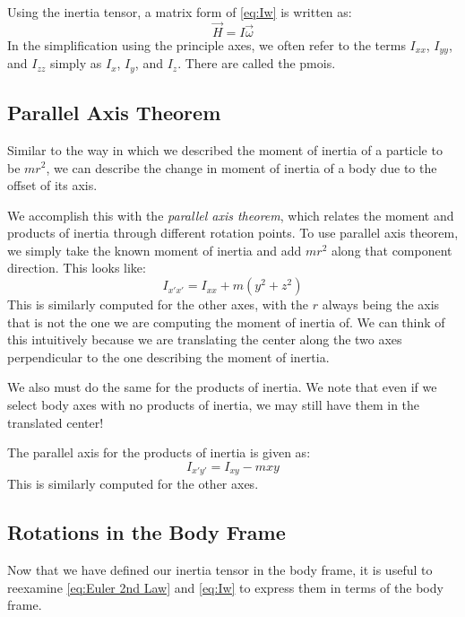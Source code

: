 \documentclass[12pt]{report}
\begin{document}
Using the inertia tensor, a matrix form of \eqref{eq:Iw}  is written as:
\begin{equation}\label{eq:IwVec}
    \vec{H}=I\vec{\omega}
\end{equation}
In the simplification using the principle axes, we often refer to the terms $I_{xx}$, $I_{yy}$, and $I_{zz}$ simply as $I_x$, $I_y$, and $I_z$. There are called the \glspl{pmoi}.

\subsection{Parallel Axis Theorem}
Similar to the way in which we described the moment of inertia of a particle to be $mr^2$, we can describe the change in moment of inertia of a body due to the offset of its axis.

We accomplish this with the \textit{parallel axis theorem}, which relates the moment and products of inertia through different rotation points. To use parallel axis theorem, we simply take the known moment of inertia and add $mr^2$ along that component direction. This looks like:
$$I_{x'x'}=I_{xx}+m\left(y^2+z^2\right)$$
This is similarly computed for the other axes, with the $r$ always being the axis that is not the one we are computing the moment of inertia of. We can think of this intuitively because we are translating the center along the two axes perpendicular to the one describing the moment of inertia.

We also must do the same for the products of inertia. We note that even if we select body axes with no products of inertia, we may still have them in the translated center!

The parallel axis for the products of inertia is given as:
$$I_{x'y'}=I_{xy}-mxy$$
This is similarly computed for the other axes.
\subsection{Rotations in the Body Frame}\label{sec:rotations in the body frame}
Now that we have defined our inertia tensor in the body frame, it is useful to reexamine \eqref{eq:Euler 2nd Law} and \eqref{eq:Iw} to express them in terms of the body frame.
\end{document}
